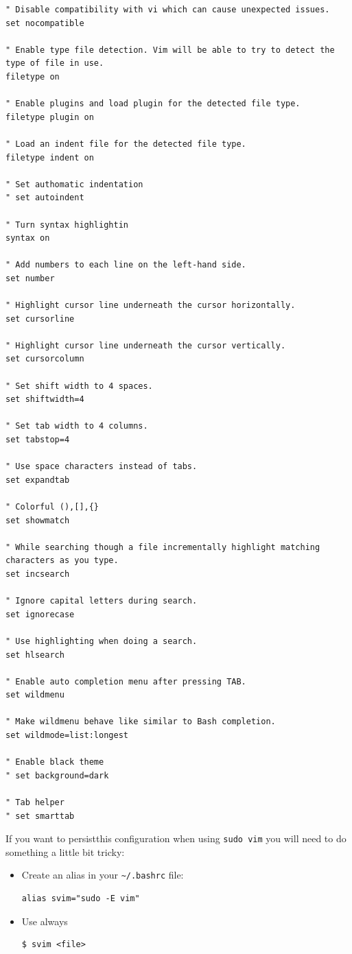 \documentclass{article}
\newenvironment{codetemplate}[1][]{%
  \mybasecolorbox[#1]
  \itshape
}{%
  \endmybasecolorbox
}
\begin{document}
\begin{codetemplate}{}
\begin{verbatim}
" Disable compatibility with vi which can cause unexpected issues.
set nocompatible

" Enable type file detection. Vim will be able to try to detect the type of file in use.
filetype on

" Enable plugins and load plugin for the detected file type.
filetype plugin on

" Load an indent file for the detected file type.
filetype indent on

" Set authomatic indentation
" set autoindent

" Turn syntax highlightin
syntax on

" Add numbers to each line on the left-hand side.
set number

" Highlight cursor line underneath the cursor horizontally.
set cursorline

" Highlight cursor line underneath the cursor vertically.
set cursorcolumn

" Set shift width to 4 spaces.
set shiftwidth=4

" Set tab width to 4 columns.
set tabstop=4

" Use space characters instead of tabs.
set expandtab

" Colorful (),[],{}
set showmatch

" While searching though a file incrementally highlight matching characters as you type.
set incsearch

" Ignore capital letters during search.
set ignorecase

" Use highlighting when doing a search.
set hlsearch

" Enable auto completion menu after pressing TAB.
set wildmenu

" Make wildmenu behave like similar to Bash completion.
set wildmode=list:longest

" Enable black theme
" set background=dark

" Tab helper
" set smarttab
\end{verbatim}
\end{codetemplate}

If you want to persistthis configuration when using \verb|sudo vim| you will need to do something a little bit tricky:

\begin{itemize}
    \item Create an alias in your \verb|~/.bashrc| file:
\begin{codetemplate}{}
\begin{verbatim}
alias svim="sudo -E vim"
\end{verbatim}
\end{codetemplate}

    \item Use always
\begin{codetemplate}{}
\begin{verbatim}
$ svim <file>
\end{verbatim}
\end{codetemplate}
\end{itemize}
\end{document}
